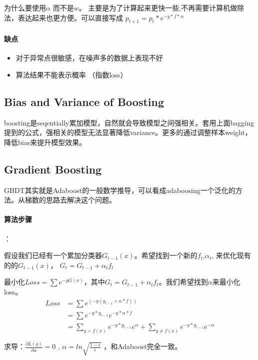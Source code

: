 \documentclass[12pt,a4paper,oneside]{article}
\begin{document}
\begin{CJK*}{UTF8}{gbsn}
为什么要使用$\alpha$ 而不是$w$。 主要是为了计算起来更快一些,不再需要计算机做除法，表达起来也更方便。可以直接写成 $p_{t+1}=p_{t}*e^{-y*f*\alpha}$

\paragraph{缺点}

\begin{itemize}
\item 对于异常点很敏感，在噪声多的数据上表现不好
\item 算法结果不能表示概率 （指数loss）
\end{itemize}

\subsection{Bias and Variance of Boosting}
boosting是seqentially累加模型，自然就会导致模型之间强相关。套用上面bagging提到的公式，强相关的模型无法显著降低variance。更多的通过调整样本weight，降低bias来提升模型效果。


\subsection{Gradient Boosting}
GBDT其实就是Adaboost的一般数学推导，可以看成adaboosing一个泛化的方法。从梯数的思路去解决这个问题。

\paragraph{算法步骤}：
\newline

假设我们已经有一个累加分类器$G_{t-1}(x)$。希望找到一个新的$f_{t}$,$\alpha_{t}$, 来优化现有的的$G_{t-1}(x)$， $G_{t} = G_{t-1} + \alpha_{t}f_{t}$

最小化$Loss = \sum e^{-yG(x)}$，其中$G_{t} = G_{t-1} + \alpha_{t}f_{t}$。我们希望找到$\alpha$来最小化loss。
\begin{align*}
Loss &= \sum e^{\left(-y(g_{t-1}+\alpha*f)\right)} \\
&= \sum e^{-y*g_{t-1}}e^{-y*\alpha*f} \\
&= \sum_{y=f(x)} e^{-y*g_{t-1}}e^{\alpha} +  \sum_{y\neq f(x)} e^{-y*g_{t-1}}e^{-\alpha} \\ \\
\end{align*}
求导：$\frac{\partial L(g)}{\partial \alpha}=0$ , $\alpha= ln\sqrt{\frac{1-\epsilon}{\epsilon}}$
，和Adaboost完全一致。


\end{CJK*}
\end{document}
